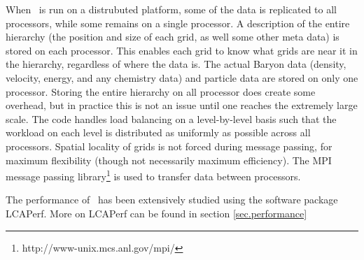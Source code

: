 When \enzo\ is run on a distrubuted platform, some of the data is
replicated to all processors, while some remains on a single processor.
A description of the entire hierarchy (the position and size of each grid, as well
some other meta data) is stored on each processor.  This enables each
grid to know what grids are near it in the hierarchy, regardless of
where the data is.  The actual Baryon data (density, velocity, energy,
and any chemistry data) and particle data are stored on only one
processor.  Storing the entire hierarchy on all processor does create
some overhead, but in practice this is not an issue until one reaches
the extremely large scale.
  The code handles load balancing 
on a level-by-level basis such that the workload on each level is 
distributed as uniformly as possible across all processors.  Spatial locality of 
grids is not forced during message passing, for maximum flexibility (though not
necessarily maximum efficiency).  
The MPI message passing library\footnote{http://www-unix.mcs.anl.gov/mpi/}
 is used to transfer data between processors.

The performance of \enzo\ has been extensively studied using the
software package LCAPerf.  More on LCAPerf can be found in section
\ref{sec.performance} 



